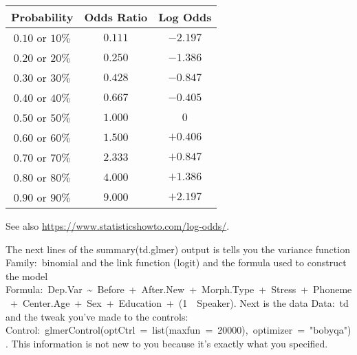\documentclass[
  10pt,
  letterpaper]{article}
\renewcommand\texttt[1]{{\ttfamily\color{BrickRed}#1}}
\begin{document}
\begin{tcolorbox}
\begin{center}
    \begin{tabular}{ccc}
    \toprule
        Probability & Odds Ratio & Log Odds \\ 
        \midrule
        $0.10$ or $10\%$ & $0.111$ & $-2.197$ \\ 
        $0.20$ or $20\%$ & $0.250$ & $-1.386$ \\ 
        $0.30$ or $30\%$ & $0.428$ & $-0.847$ \\ 
        $0.40$ or $40\%$ & $0.667$ & $-0.405$ \\ 
        $0.50$ or $50\%$ & $1.000$ & $0$ \\ 
        $0.60$ or $60\%$ & $1.500$ & $+0.406$ \\ 
        $0.70$ or $70\%$ & $2.333$ & $+0.847$ \\ 
        $0.80$ or $80\%$ & $4.000$ & $+1.386$ \\ 
        $0.90$ or $90\%$ & $9.000$ & $+2.197$ \\ 
        \bottomrule
    \end{tabular}
    \end{center}

See also \url{https://www.statisticshowto.com/log-odds/}.

\end{tcolorbox}

The next lines of the \texttt{summary(td.glmer)} output is tells you the
variance function \texttt{Family:\ binomial} and the link function
\texttt{(logit)} and the formula used to construct the model
\texttt{Formula:\ Dep.Var\ \textasciitilde{}\ Before\ +\ After.New\ +\ Morph.Type\ +\ Stress\ +\ Phoneme\ +\ Center.Age\ +\ Sex\ +\ Education\ +\ (1\ \textbar{}\ Speaker)}.
Next is the data \texttt{Data:\ td} and the tweak you've made to the
controls:
\texttt{Control:\ glmerControl(optCtrl\ =\ list(maxfun\ =\ 20000),\ optimizer\ =\ "bobyqa")}.
This information is not new to you because it's exactly what you
specified.
\end{document}
